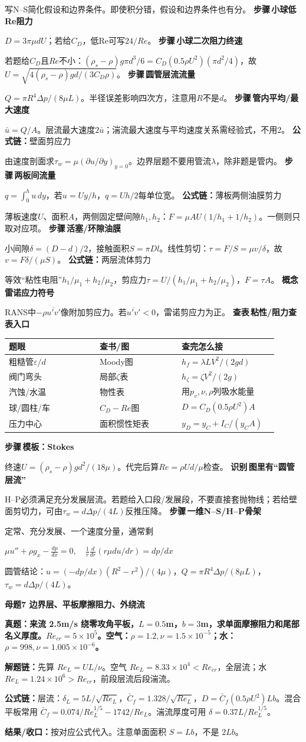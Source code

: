\documentclass[a4paper]{article}
\newcommand{\mt}[1]{\vspace{0.45pt}\colorbox{M}{\parbox{\dimexpr\linewidth-2\fboxsep}{\color{white}\bfseries #1}}\par}
\newcommand{\qt}[1]{\vspace{0.25pt}\colorbox{Q}{\parbox{\dimexpr\linewidth-2\fboxsep}{\color{white}\bfseries #1}}\par}
\newcommand{\ans}[1]{\colorbox{G}{\parbox{\dimexpr\linewidth-2\fboxsep}{#1}}\par}
\newcommand{\chain}[1]{{\color{A}\bfseries 解题链：}#1\par}
\newcommand{\res}[1]{{\color{E}\bfseries 结果/收口：}#1\par}
\newcommand{\form}[1]{{\color{M}\bfseries 公式链：}#1\par}
\newcommand{\fmlb}[1]{\ans{\begin{adjustbox}{max width=.96\linewidth}$\displaystyle #1$\end{adjustbox}}}
\newcommand{\labtag}[3]{{\bfseries\color{#1}\colorbox{#1}{\color{white}\fontsize{2.35}{2.48}\selectfont #2}\,#3}\par}
\newcommand{\iden}[1]{\labtag{C}{识别}{#1}}
\newcommand{\step}[1]{\labtag{S}{步骤}{#1}}
\newcommand{\lookup}[1]{\labtag{C}{查表}{#1}}
\newcommand{\concept}[1]{\labtag{V}{概念}{#1}}
\newcommand{\idq}[1]{\iden{#1}}
\newcommand{\stepq}[1]{\step{#1}}
\newcommand{\formq}[1]{\form{#1}}
\newcommand{\lookq}[1]{\lookup{#1}}
\newcommand{\conceptq}[1]{\concept{#1}}
\newenvironment{vfourWrap}{\par\begingroup\fontsize{2.68}{2.84}\selectfont\setlength{\fboxsep}{0.45pt}}{\par\endgroup}
\begin{document}
\begin{multicols}{3}
\begin{vfourWrap}
写N--S简化假设和边界条件。即使积分错，假设和边界条件也有分。
\stepq{小球低Re阻力}
$D=3\pi\mu dU$；若给$C_D$，低Re可写$24/Re$。
\stepq{小球二次阻力终速}
若题给$C_D$且$Re$不小：$(\rho_s-\rho)g\pi d^3/6=C_D(0.5\rho U^2)(\pi d^2/4)$，故$U=\sqrt{4(\rho_s-\rho)gd/(3C_D\rho)}$。
\stepq{圆管层流流量}
$Q=\pi R^4\Delta p/(8\mu L)$。半径误差影响四次方，注意用$R$不是$d$。
\stepq{管内平均/最大速度}
$\bar u=Q/A$。层流最大速度$2\bar u$；湍流最大速度与平均速度关系需经验式，不用2。
\formq{壁面剪应力}
由速度剖面求$\tau_w=\mu(\partial u/\partial y)_{y=0}$。边界层题不要用管流$\lambda$，除非题是管内。
\stepq{两板间流量}
$q=\int_0^hu\,dy$，若$u=Uy/h$，$q=Uh/2$每单位宽。
\formq{薄板两侧油膜剪力}
薄板速度$U$、面积$A$，两侧固定壁间隙$h_1,h_2$：$F=\mu AU(1/h_1+1/h_2)$。一侧则只取对应项。
\stepq{活塞/环隙油膜}
小间隙$\delta=(D-d)/2$，接触面积$S=\pi Dl$。线性剪切：$\tau=F/S=\mu v/\delta$，故$v=F\delta/(\mu S)$。
\formq{两层流体剪力}
等效“粘性电阻”$h_1/\mu_1+h_2/\mu_2$，剪应力$\tau=U/(h_1/\mu_1+h_2/\mu_2)$，$F=\tau A$。
\conceptq{雷诺应力符号}
RANS中$-\rho\overline{u'v'}$像附加剪应力。若$\overline{u'v'}<0$，雷诺剪应力为正。
\lookq{粘性/阻力查表入口}
\begin{tabular}{|p{0.31\linewidth}|p{0.28\linewidth}|p{0.33\linewidth}|}\hline
题眼 & 查书/图 & 查完怎么接\\\hline
粗糙管$\varepsilon/d$ & Moody图 & $h_f=\lambda L V^2/(2gd)$\\\hline
阀门弯头 & 局部$\zeta$表 & $h_\zeta=\zeta V^2/(2g)$\\\hline
汽蚀/水温 & 物性表 & 用$p_v,\nu,\rho$列吸水能量\\\hline
球/圆柱/车 & $C_D-Re$图 & $D=C_D(0.5\rho U^2)A$\\\hline
压力中心 & 面积惯性矩表 & $y_D=y_C+I_C/(y_CA)$\\\hline
\end{tabular}
\stepq{模板：Stokes}
终速$U=(\rho_s-\rho)gd^2/(18\mu)$。代完后算$Re=\rho Ud/\mu$检查。
\idq{图里有“圆管层流”}
H--P必须满足充分发展层流。若题给入口段/发展段，不要直接套抛物线；若给壁面剪切力，可由$\tau_w=d\Delta p/(4L)$反推压降。
\stepq{一维N--S/H--P骨架}
定常、充分发展、一个速度分量，通常剩
\fmlb{\mu u''+\rho g_x-\frac{dp}{dx}=0,\quad \frac1r\frac d{dr}(r\mu du/dr)=dp/dx}
圆管结论：$u=(-dp/dx)(R^2-r^2)/(4\mu)$，$Q=\pi R^4\Delta p/(8\mu L)$，$\tau_w=d\Delta p/(4L)$。
\end{vfourWrap}
\mt{母题7 边界层、平板摩擦阻力、外绕流}
\qt{真题：来流 2.5m/s 绕零攻角平板，$L=0.5$m，$b=3$m，求单面摩擦阻力和尾部名义厚度。$Re_{cr}=5\times10^5$。空气：$\rho=1.2,\nu=1.5\times10^{-5}$；水：$\rho=998,\nu=1.005\times10^{-6}$。}
\chain{先算 $Re_L=UL/\nu$。空气 $Re_L=8.33\times10^4<Re_{cr}$，全层流；水 $Re_L=1.24\times10^6>Re_{cr}$，前段层流后段湍流。}
\form{层流：$\delta_L=5L/\sqrt{Re_L}$，$\bar C_f=1.328/\sqrt{Re_L}$，$D=\bar C_f(0.5\rho U^2)Lb$。混合平板常用 $\bar C_f=0.074/Re_L^{1/5}-1742/Re_L$。湍流厚度可用 $\delta=0.37L/Re_L^{1/5}$。}
\res{按对应公式代入。注意单面面积 $S=Lb$，不是 $2Lb$。}


\end{multicols}
\end{document}
